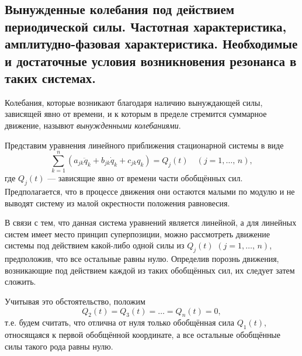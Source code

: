 \documentclass[a4paper,12pt]{article}
\begin{document}
\subsection{Вынужденные колебания под действием периодической силы. Частотная
характеристика, амплитудно-фазовая характеристика. Необходимые и достаточные
условия возникновения резонанса в таких системах.}
\begin{dfn}
	Колебания, которые возникают благодаря наличию вынуждающей силы,
	зависящей явно от времени, и к которым в пределе стремится суммарное
	движение, назывют \emph{вынужденными колебаниями}.
\end{dfn}
Представим уравнения линейного приближения стационарной системы в виде
\[
	\sum_{k=1}^{n} (a_{jk}\ddot{q}_k+b_{jk}\dot{q}_k+c_{jk}q_k)=Q_j (t)
	\quad (j=1,\ldots,\,n),
\] 
где $Q_j (t)$ --- зависящие явно от времени части обобщённых сил.
Предполагается, что в процессе движения они остаются малыми по модулю и не
выводят систему из малой окрестности положения равновесия.

В связи с тем, что данная система уравнений является линейной, а для линейных
систем имеет место принцип суперпозиции, можно рассмотреть движение системы
под действием какой-либо одной силы из $Q_j(t)$ $(j=1,\ldots,\,n)$, предположив,
что все остальные равны нулю. Определив порознь движения, возникающие под
действием каждой из таких обобщённых сил, их следует затем сложить.

Учитывая это обстоятельство, положим
\[
	Q_2(t)=Q_3(t)=\ldots=Q_n(t)=0,
\]
т.\:е. будем считать, что отлична от нуля только обобщённая сила $Q_1(t)$,
относящаяся к первой обобщённой координате, а все остальные обобщённые силы
такого рода равны нулю.
 
\end{document}

